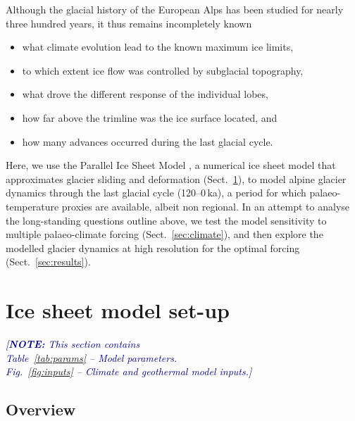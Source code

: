 \documentclass[tc, manuscript]{copernicus}
\newcommand{\note}[1]{\textcolor{darkblue}{\emph{[\textbf{NOTE:} #1]}}}
\begin{document}
    Although the glacial history of the European Alps has been studied for
    nearly three hundred years, it thus remains incompletely known
    \begin{itemize}
      \item what climate evolution lead to the known maximum ice limits,
      \item to which extent ice flow was controlled by subglacial topography,
      \item what drove the different response of the individual lobes,
      \item how far above the trimline was the ice surface located, and
      \item how many advances occurred during the last glacial cycle.
    \end{itemize}

    Here, we use the Parallel Ice Sheet Model
    \citep[PISM,][]{PISM-authors.2017}, a numerical ice sheet model that
    approximates glacier sliding and deformation (Sect.~\ref{sec:model}), to
    model alpine glacier dynamics through the last glacial cycle (120--0\,ka),
    a period for which palaeo-temperature proxies are available, albeit non
    regional. In an attempt to analyse the long-standing questions outline
    above, we test the model sensitivity to multiple palaeo-climate forcing
    (Sect.~\ref{sec:climate}), and then explore the modelled glacier dynamics
    at high resolution for the optimal forcing (Sect.~\ref{sec:results}).


\section{Ice sheet model set-up}
\label{sec:model}

    \note{This section contains\\
        Table~\ref{tab:params} -- Model parameters.\\
        Fig.~\ref{fig:inputs} -- Climate and geothermal model inputs.}


\subsection{Overview}
\label{sec:overview}
\end{document}
